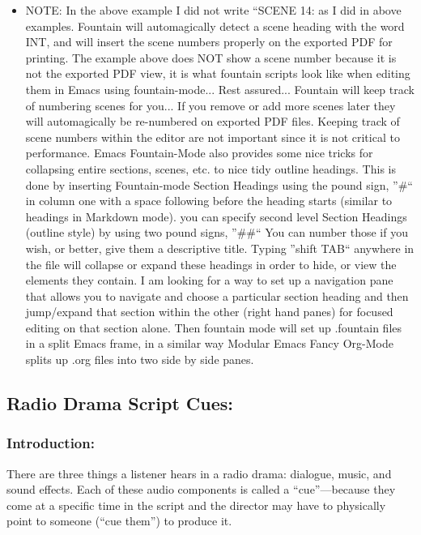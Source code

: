 \documentclass[openleft,oneside,showtrims]{memoir}
\begin{document}
\begin{itemize}
\begin{itemize}
\begin{itemize}
\item NOTE: In the above example I did not write ``SCENE 14: as I did in above examples.  Fountain will automagically detect a scene heading with the word INT, and will insert the scene numbers properly on the exported PDF for printing. The example above does NOT show a scene number because it is not the exported PDF view, it is what fountain scripts look like when editing them in Emacs using fountain-mode... Rest assured... Fountain will keep track of numbering scenes for you... If you remove or add more scenes later they will automagically be re-numbered on exported PDF files. Keeping track of scene numbers within the editor are not important since it is not critical to performance.  Emacs Fountain-Mode also provides some nice tricks for collapsing entire sections, scenes, etc. to nice tidy outline headings.  This is done by inserting Fountain-mode Section Headings using the pound sign, ''\#`` in column one with a space following before the heading starts (similar to headings in Markdown mode). you can specify second level Section Headings (outline style) by using two pound signs, ''\#\#``  You can number those if you wish, or better, give them a descriptive title. Typing ''shift TAB`` anywhere in the file will collapse or expand these headings in order to hide, or view the elements they contain.  I am looking for a way to set up a navigation pane that allows you to navigate and choose a particular section heading and then jump/expand that section within the other (right hand panes) for focused editing on that section alone.  Then fountain mode will set up .fountain files in a split Emacs frame, in a similar way Modular Emacs Fancy Org-Mode splits up .org files into two side by side panes.
\end{itemize}
\end{itemize}
\end{itemize}


\subsection{Radio Drama Script Cues:}
\label{sec:org0d01144}
\subsubsection*{Introduction:}
\label{sec:org3982091}

There are three things a listener hears in a radio drama: dialogue, music, and sound effects. Each of these audio components is called a ``cue''—because they come at a specific time in the script and the director may have to physically point to someone (``cue them'') to produce it.
\end{document}
